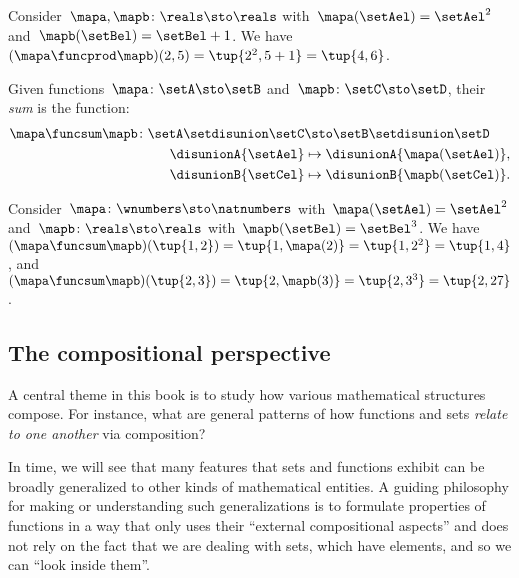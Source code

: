 \begin{example}
    Consider~$\mapa,\mapb \colon \reals \sto \reals$ with~$\mapa(\setAel)=\setAel^2$ and~$\mapb(\setBel)=\setBel+1$.
    We have~$(\mapa \funcprod \mapb)(2,5)=\tup{2^2,5+1}=\tup{4,6}$.
\end{example}

\begin{ctdefinition}
    \label{def:sum-of-functions}
    Given functions~$\mapa\colon \setA \sto \setB$ and~$\mapb\colon \setC \sto \setD$, their \emph{sum} is the function:
    \begin{equation}
        \begin{aligned}
            \mapa \funcsum \mapb \colon \setA \setdisunion \setC & \sto \setB\setdisunion \setD \\
            \disunionA{\setAel}                                  & \mapsto \disunionA{\mapa(\setAel)}, \\
            \disunionB{\setCel}                                  & \mapsto \disunionB{\mapb(\setCel)}.
            \\
        \end{aligned}
    \end{equation}
\end{ctdefinition}

\begin{example}
    Consider~$\mapa\colon \wnumbers \sto \natnumbers$ with~$\mapa(\setAel)=\setAel^2$ and~$\mapb\colon \reals \sto \reals$ with~$\mapb(\setBel)=\setBel^3$.
    We have~$(\mapa \funcsum \mapb)(\tup{1,2})=\tup{1,\mapa(2)}=\tup{1,2^2}=\tup{1,4}$, and~$(\mapa \funcsum \mapb)(\tup{2,3})=\tup{2,\mapb(3)}=\tup{2,3^3} = \tup{2,27}$.
\end{example}

\subsection{The compositional perspective}

A central theme in this book is to study how various mathematical structures compose.
For instance, what are general patterns of how functions and sets \emph{relate to one another} via composition?

In time, we will see that many features that sets and functions exhibit can be broadly generalized to other kinds of mathematical entities.
A guiding philosophy for making or understanding such generalizations is to formulate properties of functions in a way that only uses their ``external compositional aspects'' and does not rely on the fact that we are dealing with sets, which have elements, and so we can ``look inside them''.

